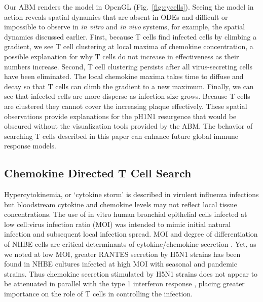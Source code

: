 \documentclass[10pt]{article}
\begin{document}
Our ABM renders the model in OpenGL (Fig.~\ref{fig:cycells}).  Seeing the model in action reveals spatial dynamics that are absent in ODEs and difficult or impossible to observe in \textit{in vitro} and \textit{in vivo} systems, for example, the spatial dynamics discussed earlier.  First, because T cells find infected cells by climbing a gradient, we see T cell clustering at local maxima of chemokine concentration, a possible explanation for why T cells do not increase in effectiveness as their numbers increase.   Second, T cell clustering persists after all virus-secreting cells have been eliminated.  The local chemokine maxima takes time to diffuse and decay so that T cells can climb the gradient to a new maximum.  Finally, we can see that infected cells are more disperse as infection size grows.  Because T cells are clustered they cannot cover the increasing plaque effectively.  These spatial observations provide explanations for the pH1N1 resurgence that would be obscured without the visualization tools provided by the ABM.   The behavior of searching T cells described in this paper 
can enhance future global immune response models.

\subsection*{Chemokine Directed T Cell Search}

Hypercytokinemia, or `cytokine storm' is described in virulent influenza infections \cite{DeJong2006} but bloodstream cytokine and chemokine levels may not reflect local tissue concentrations.  The use of in vitro human bronchial epithelial cells \cite{Mitchell2011} infected at low cell:virus infection ratio (MOI) was intended to mimic initial natural infection and subsequent local infection spread.  MOI and degree of differentiation of NHBE cells are critical determinants of cytokine/chemokine secretion \cite{Chan2010}.   Yet, as we noted at low MOI, greater RANTES secretion by H5N1 strains has been found in NHBE cultures infected at high MOI with seasonal \cite{Chan2005, Chan2010, Zeng2011} and pandemic \cite{Zeng2011} strains.  Thus chemokine secretion stimulated by H5N1 strains does not appear to be attenuated in parallel with the type 1 interferon response \cite{Zeng2007}, placing greater importance on the role of T cells in controlling the infection.
\end{document}
